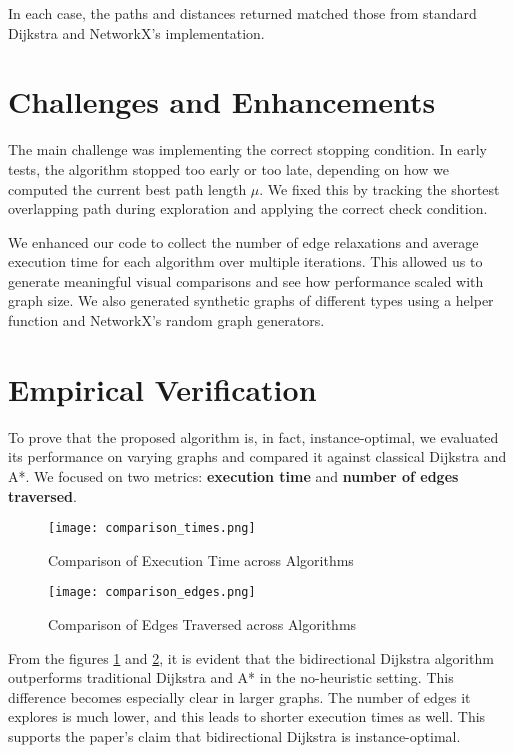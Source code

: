 \documentclass[12pt]{article}
\begin{document}
In each case, the paths and distances returned matched those from standard Dijkstra and NetworkX’s implementation.

\section{Challenges and Enhancements}
The main challenge was implementing the correct stopping condition. In early tests, the algorithm stopped too early or too late, depending on how we computed the current best path length $\mu$. We fixed this by tracking the shortest overlapping path during exploration and applying the correct check condition.

We enhanced our code to collect the number of edge relaxations and average execution time for each algorithm over multiple iterations. This allowed us to generate meaningful visual comparisons and see how performance scaled with graph size. We also generated synthetic graphs of different types using a helper function and NetworkX’s random graph generators.

\section{Empirical Verification}
To prove that the proposed algorithm is, in fact, instance-optimal, we evaluated its performance on varying graphs and compared it against classical Dijkstra and A*. We focused on two metrics: \textbf{execution time} and \textbf{number of edges traversed}. \\[1ex]

\begin{figure}[h]
    \centering
    \texttt{[image: comparison\_times.png]}
    \caption{Comparison of Execution Time across Algorithms}
    \label{fig:exec-time}
\end{figure}

\begin{figure}[h]
    \centering
    \texttt{[image: comparison\_edges.png]}
    \caption{Comparison of Edges Traversed across Algorithms}
    \label{fig:edges-traversed}
\end{figure}

\break
From the figures \ref{fig:exec-time} and \ref{fig:edges-traversed}, it is evident that the bidirectional Dijkstra algorithm outperforms traditional Dijkstra and A* in the no-heuristic setting. This difference becomes especially clear in larger graphs. The number of edges it explores is much lower, and this leads to shorter execution times as well. This supports the paper’s claim that bidirectional Dijkstra is instance-optimal.
\end{document}
